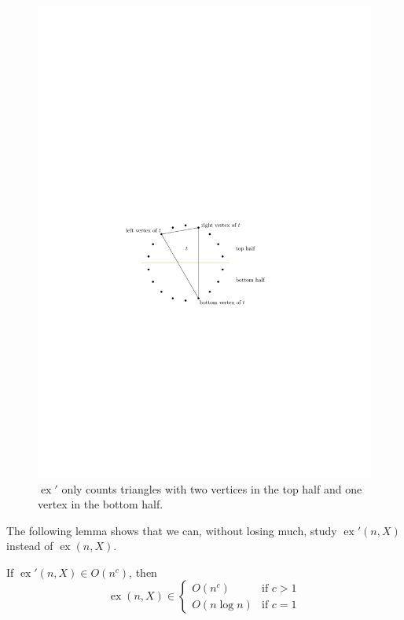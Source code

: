 \documentclass{patmorin}
\DeclareMathOperator{\ex}{ex}
\begin{document}
\begin{figure}
  \begin{center}
    \includegraphics{figs/left-right}
  \end{center}
  \caption{$\ex'$ only counts triangles with two vertices in the top half
     and one vertex in the bottom half.}
\end{figure}

The following lemma shows that we can, without losing much, study $\ex'(n,X)$ instead of $\ex(n,X)$.

\begin{lem}
  If $\ex'(n,X)\in O(n^c)$, then
\[
   \ex(n,X)\in 
      \begin{cases} 
          O(n^c)     & \text{if $c>1$} \\
          O(n\log n) & \text{if $c=1$}
      \end{cases}
\]
\end{lem}
\end{document}
